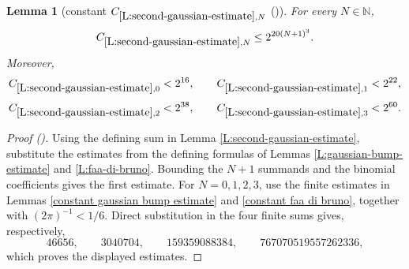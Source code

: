 \documentclass[12pt,reqno]{amsart}
\newcommand{\auto}{{({\tiny\faCar})}}
\theoremstyle{plain}
\newtheorem{lemma}[theorem]{Lemma}
\numberwithin{equation}{section}
\theoremstyle{remark}
\newcommand{\uses}[1]{}
\newcommand{\usesdefs}[1]{}
\newcommand{\N}{{\mathbb N}}
\newcommand{\ls}[1]{{\color{red}{[L: #1]}}}
\newcommand{\ct}[1]{{\color{magenta}{[C: #1]}}}
\newcommand{\jr}[1]{{\color{orange}{[J: #1]}}}
\begin{document}
\begin{lemma}[constant $C_{\ref{L:second-gaussian-estimate},N}$ \auto]\label{constant second gaussian estimate}\uses{L:gaussian-bump-estimate,L:faa-di-bruno,constant gaussian bump estimate,constant faa di bruno,L:second-gaussian-estimate}\usesdefs{}
For every $N\in\N$,
\begin{equation}\label{constant second gaussian estimate bound}
C_{\ref{L:second-gaussian-estimate},N}\le2^{20(N+1)^3}.
\end{equation}
Moreover,
\begin{equation}\label{auto:constant-second-gaussian-estimate-small}
C_{\ref{L:second-gaussian-estimate},0}<2^{16},
\qquad
C_{\ref{L:second-gaussian-estimate},1}<2^{22},
\end{equation}
\begin{equation}\label{auto:constant-second-gaussian-estimate-small-high}
C_{\ref{L:second-gaussian-estimate},2}<2^{38},
\qquad
C_{\ref{L:second-gaussian-estimate},3}<2^{60}.
\end{equation}
\end{lemma}
\begin{proof}[Proof \auto]
Using the defining sum in Lemma \ref{L:second-gaussian-estimate}, substitute the estimates from the defining formulas of Lemmas \ref{L:gaussian-bump-estimate} and \ref{L:faa-di-bruno}. Bounding the $N+1$ summands and the binomial coefficients gives the first estimate. For $N=0,1,2,3$, use the finite estimates in Lemmas \ref{constant gaussian bump estimate} and \ref{constant faa di bruno}, together with $(2\pi)^{-1}<1/6$. Direct substitution in the four finite sums gives, respectively,
\[
46656,\qquad 3040704,\qquad 159359088384,\qquad 767070519557262336,
\]
which proves the displayed estimates.
\end{proof}


\jr{Need this also for other than the standard bump function $\Phi$ (in reduction section)}
\ls{I changed the assumptions on $\Phi$ (now called $\phi$ since it is no longer the standard bump) to just reflect what is needed. It seems that in applications, $\phi$ is either the standard bump or a window.}
\ct{or maybe neither, as the stadnard bump definition may change
and likewise the window.}
\end{document}
